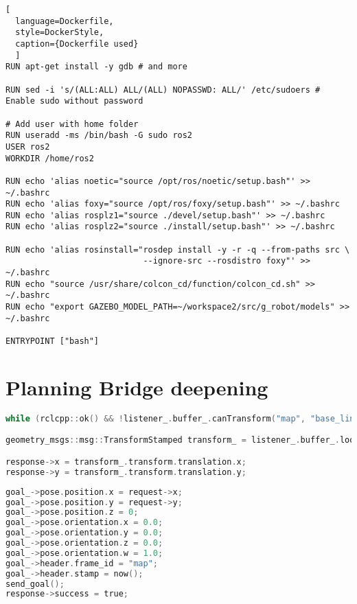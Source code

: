 \begin{lstlisting}[
  language=Dockerfile,
  style=DockerStyle,
  caption={Dockerfile used}
  ]
RUN apt-get install -y gdb # and more

RUN sed -i 's/(ALL:ALL) ALL/(ALL) NOPASSWD: ALL/' /etc/sudoers # Enable sudo without password

# Add user with home folder
RUN useradd -ms /bin/bash -G sudo ros2
USER ros2
WORKDIR /home/ros2

RUN echo 'alias noetic="source /opt/ros/noetic/setup.bash"' >> ~/.bashrc
RUN echo 'alias foxy="source /opt/ros/foxy/setup.bash"' >> ~/.bashrc
RUN echo 'alias rosplz1="source ./devel/setup.bash"' >> ~/.bashrc
RUN echo 'alias rosplz2="source ./install/setup.bash"' >> ~/.bashrc

RUN echo 'alias rosinstall="rosdep install -y -r -q --from-paths src \
                            --ignore-src --rosdistro foxy"' >> ~/.bashrc
RUN echo "source /usr/share/colcon_cd/function/colcon_cd.sh" >> ~/.bashrc
RUN echo "export GAZEBO_MODEL_PATH=~/workspace2/src/g_robot/models" >> ~/.bashrc

ENTRYPOINT ["bash"]
\end{lstlisting}

\chapter{Planning Bridge deepening}
\label{cha:deepening}

\newsavebox\poseserver

\noindent\begin{lrbox}{\poseserver}
  \noindent\begin{lstlisting}[language=C, style=CStyleTextWidth]
while (rclcpp::ok() && !listener_.buffer_.canTransform("map", "base_link", tf2::TimePoint())) rate.sleep();

geometry_msgs::msg::TransformStamped transform_ = listener_.buffer_.lookupTransform("map", "base_link", tf2::TimePoint());

response->x = transform_.transform.translation.x;
response->y = transform_.transform.translation.y;
  \end{lstlisting}
\end{lrbox}

\newsavebox\navigationclient

\noindent\begin{lrbox}{\navigationclient}
  \noindent\begin{lstlisting}[language=C, style=CStyleNoFrame]
goal_->pose.position.x = request->x;
goal_->pose.position.y = request->y;
goal_->pose.position.z = 0;
goal_->pose.orientation.x = 0.0;
goal_->pose.orientation.y = 0.0;
goal_->pose.orientation.z = 0.0;
goal_->pose.orientation.w = 1.0;
goal_->header.frame_id = "map";
goal_->header.stamp = now();
send_goal();
response->success = true;
  \end{lstlisting}
\end{lrbox}

